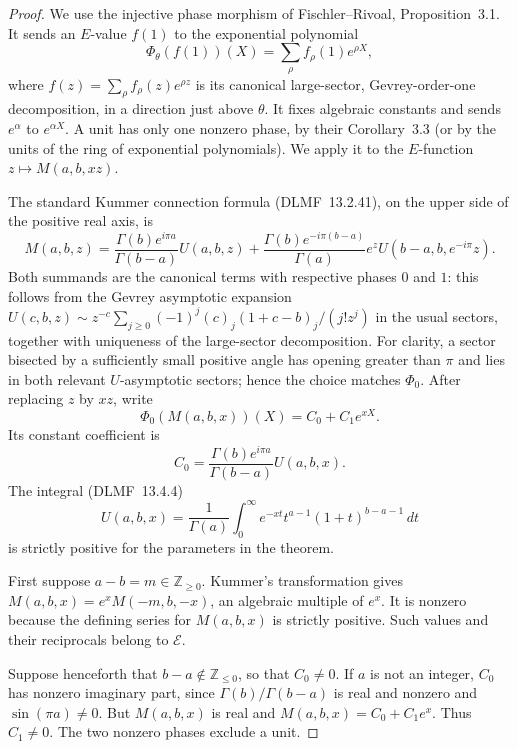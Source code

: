 \documentclass[11pt,a4paper]{article}
\theoremstyle{definition}
\theoremstyle{remark}
\numberwithin{equation}{section}
\begin{document}
\begin{proof}
We use the injective phase morphism of Fischler--Rivoal,
Proposition~3.1.  It sends an $E$-value $f(1)$ to the exponential
polynomial
\[
 \Phi_\theta(f(1))(X)=\sum_\rho f_\rho(1)e^{\rho X},
\]
where $f(z)=\sum_\rho f_\rho(z)e^{\rho z}$ is its canonical
large-sector, Gevrey-order-one decomposition, in a direction just above
$\theta$.  It fixes algebraic constants and sends $e^\alpha$ to
$e^{\alpha X}$.  A unit has only one nonzero phase, by their
Corollary~3.3 (or by the units of the ring of exponential polynomials).
We apply it to the $E$-function $z\mapsto M(a,b,xz)$.

The standard Kummer connection formula (DLMF~13.2.41), on the upper
side of the positive real axis, is
\begin{equation}
\label{p2:eq:positive-kummer-connection}
 M(a,b,z)=
 \frac{\Gamma(b)e^{i\pi a}}{\Gamma(b-a)}U(a,b,z)
 +\frac{\Gamma(b)e^{-i\pi(b-a)}}{\Gamma(a)}
     e^z U(b-a,b,e^{-i\pi}z).
\end{equation}
Both summands are the canonical terms with respective phases $0$ and
$1$: this follows from the Gevrey asymptotic expansion
$U(c,b,z)\sim z^{-c}\sum_{j\ge0}
(-1)^j(c)_j(1+c-b)_j/(j!z^j)$ in the usual sectors, together with
uniqueness of the large-sector decomposition.  For clarity, a sector
bisected by a sufficiently small positive angle has opening greater
than $\pi$ and lies in both relevant $U$-asymptotic sectors; hence the
choice matches $\Phi_0$.  After replacing $z$ by $xz$, write
\[
 \Phi_0(M(a,b,x))(X)=C_0+C_1e^{xX}.
\]
Its constant coefficient is
\begin{equation}
\label{p2:eq:positive-kummer-C0}
 C_0=\frac{\Gamma(b)e^{i\pi a}}{\Gamma(b-a)}U(a,b,x).
\end{equation}
The integral (DLMF~13.4.4)
\[
 U(a,b,x)=\frac1{\Gamma(a)}
       \int_0^\infty e^{-xt}t^{a-1}(1+t)^{b-a-1}\,dt
\]
is strictly positive for the parameters in the theorem.

First suppose $a-b=m\in\mathbb Z_{\ge0}$.  Kummer's transformation
gives $M(a,b,x)=e^xM(-m,b,-x)$, an algebraic multiple of $e^x$.
It is nonzero because the defining series for $M(a,b,x)$ is strictly
positive.  Such values and their reciprocals belong to $\mathcal E$.

Suppose henceforth that $b-a\notin\mathbb Z_{\le0}$, so that $C_0\ne0$.
If $a$ is not an integer, $C_0$ has nonzero imaginary part, since
$\Gamma(b)/\Gamma(b-a)$ is real and nonzero and
$\sin(\pi a)\ne0$.  But $M(a,b,x)$ is real and
$M(a,b,x)=C_0+C_1e^x$.  Thus $C_1\ne0$.  The two nonzero phases
exclude a unit.


\end{proof}
\end{document}
